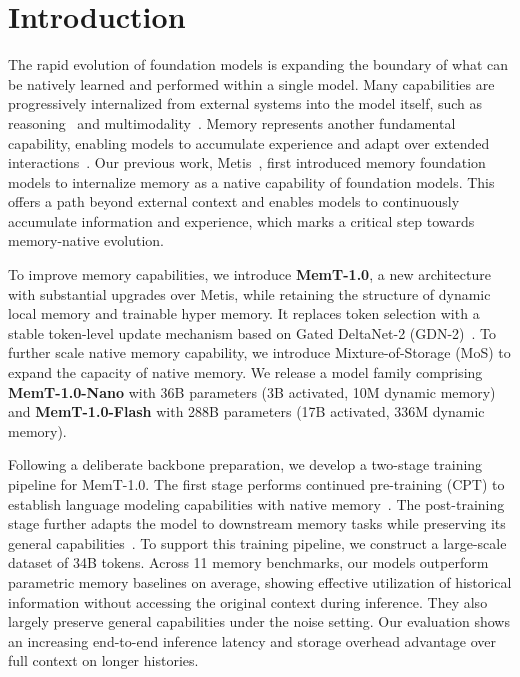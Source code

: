 \section{Introduction}

The rapid evolution of foundation models is expanding the boundary of what can be natively learned and performed within a single model.
Many capabilities are progressively internalized from external systems into the model itself, such as reasoning~\cite{guo2025deepseek,jaech2024openai} and multimodality~\cite{xu2026deepseek,team2024gemini}.
Memory represents another fundamental capability, enabling models to accumulate experience and adapt over extended interactions~\cite{zhang2025survey,hu2025memory}.
Our previous work, Metis~\cite{zhang2026metis}, first introduced memory foundation models to internalize memory as a native capability of foundation models.
This offers a path beyond external context and enables models to continuously accumulate information and experience, which marks a critical step towards memory-native evolution.

To improve memory capabilities, we introduce \textbf{MemT-1.0}, a new architecture with substantial upgrades over Metis, while retaining the structure of dynamic local memory and trainable hyper memory.
It replaces token selection with a stable token-level update mechanism based on Gated DeltaNet-2 (GDN-2)~\cite{hatamizadeh2026gated}.
To further scale native memory capability, we introduce Mixture-of-Storage (MoS) to expand the capacity of native memory.
We release a model family comprising \textbf{MemT-1.0-Nano} with 36B parameters (3B activated, 10M dynamic memory) and \textbf{MemT-1.0-Flash} with 288B parameters (17B activated, 336M dynamic memory).

Following a deliberate backbone preparation, we develop a two-stage training pipeline for MemT-1.0.
The first stage performs continued pre-training (CPT) to establish language modeling capabilities with native memory~\cite{gururangan2020don}.
The post-training stage further adapts the model to downstream memory tasks while preserving its general capabilities~\cite{ouyang2022training}.
To support this training pipeline, we construct a large-scale dataset of 34B tokens.
Across 11 memory benchmarks, our models outperform parametric memory baselines on average, showing effective utilization of historical information without accessing the original context during inference.
They also largely preserve general capabilities under the noise setting.
Our evaluation shows an increasing end-to-end inference latency and storage overhead advantage over full context on longer histories.

